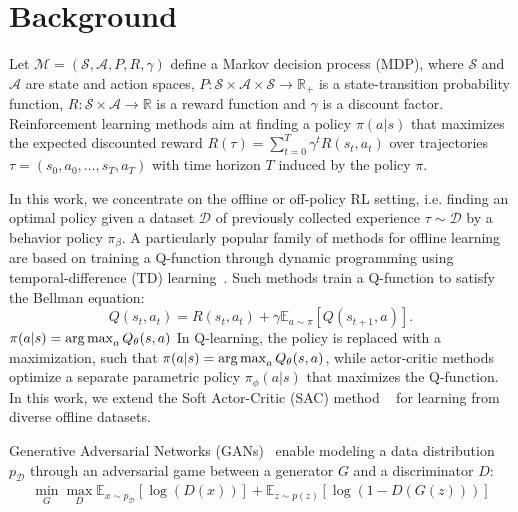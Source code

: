 \section{Background}

Let $\mathcal{M} = (\mathcal{S}, \mathcal{A}, P, R, \gamma)$ define a Markov decision process (MDP), where $\mathcal{S}$ and $\mathcal{A}$ are state and action spaces, $P: \mathcal{S} \times \mathcal{A} \times \mathcal{S} \rightarrow \mathbb{R}_{+}$ is a state-transition probability function, $R: \mathcal{S} \times \mathcal{A} \rightarrow \mathbb{R}$ is a reward function and $\gamma$ is a discount factor. Reinforcement learning methods aim at finding a policy $\pi(a | s)$ that maximizes the expected discounted reward $R(\tau) = \sum_{t=0}^T \gamma^t R(s_t,a_t)$  over trajectories $\tau = (s_0, a_0, \dots, s_T, a_T)$ with time horizon $T$ induced by the policy $\pi$. 

In this work, we concentrate on the offline or off-policy RL setting, i.e. finding an optimal policy given a dataset $\mathcal{D}$ of previously collected experience $\tau \sim \mathcal{D}$ by a behavior policy $\pi_\beta$. A particularly popular family of methods for offline learning are based on training a Q-function through dynamic programming using temporal-difference (TD) learning~\cite{watkins1992q,sutton1998}. Such methods train a Q-function to satisfy the Bellman equation:
 \[
 Q (s_t, a_t) = R(s_t, a_t) + \gamma \mathbb{E}_{a\sim\pi} [Q(s_{t+1}, a)].
 \]
 $\pi(a | s) = \operatorname*{arg\,max}_a Q_\theta(s,a)$
In Q-learning, the policy is replaced with a maximization, such that $\pi(a | s) = \operatorname*{arg\,max}_a Q_\theta(s,a)$, while actor-critic methods optimize a separate parametric policy $\pi_\phi(a | s)$ that maximizes the Q-function. In this work, we extend the Soft Actor-Critic (SAC) method ~\cite{Haarnoja18} for learning from diverse offline datasets.

Generative Adversarial Networks (GANs)~\cite{GoodfellowPMXWOCB14} enable modeling a data distribution $p_{\mathcal{D}}$ through an adversarial game between a generator $G$ and a discriminator $D$:
\begin{align}
    \min_{G} \max_{D}  \mathbb{E}_{ x \sim p_{\mathcal{D}}} [\log(D(x))] + \mathbb{E}_{z \sim p(z)} [\log(1-D(G(z)))]
    \label{eq:vanilla_gan}
\end{align}

